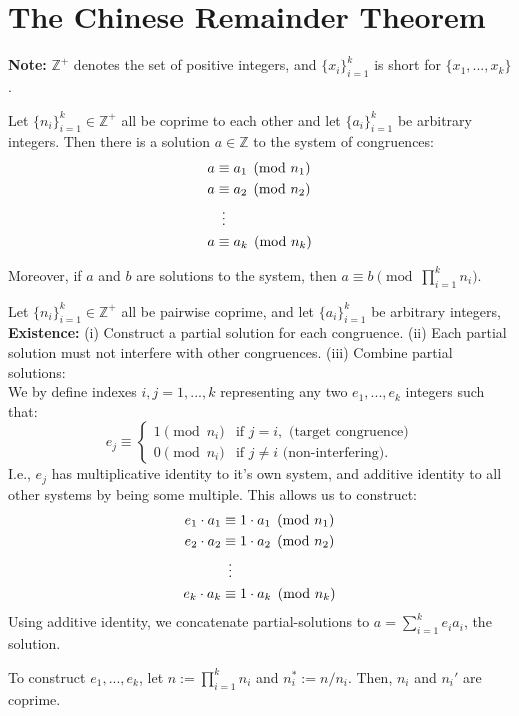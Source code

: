\section{The Chinese Remainder Theorem}

\begin{Note}
    \textbf{Note:} $\mathbb{Z}^+$ denotes the set of positive integers, and $\{x_i\}_{i=1}^k$ is short for $\{x_1,...,x_k\}$.
\end{Note}
\begin{theo}

    Let $\{n_i\}_{i=1}^k\in\mathbb{Z}^+$ all be coprime to each other and let $\{a_i\}_{i=1}^k$ be arbitrary integers. Then there is a solution $a\in\mathbb{Z}$ to the system of congruences:
    \begin{align*}
        a &\equiv a_1 \pmod{n_1} \\
        a &\equiv a_2 \pmod{n_2} \\
        &\hspace*{.5em}\vdots \\
        a &\equiv a_k \pmod{n_k}
    \end{align*}
    
    
    \noindent
    Moreover, if $a$ and $b$ are solutions to the system, then $a\equiv b\pmod{\prod_{i=1}^k n_i}$.
\end{theo}
\begin{Proof}
Let $\{n_i\}_{i=1}^k\in\mathbb{Z}^+$ all be pairwise coprime, and let $\{a_i\}_{i=1}^k$ be arbitrary integers,\\

\noindent
\textbf{Existence:} (i) Construct a partial solution for each congruence. (ii) Each
partial solution must not interfere with other congruences. (iii) Combine partial solutions:\\

\noindent
We by define indexes $i,j=1,...,k$ representing any two $e_1,...,e_k$ integers such that:
 \[e_j \equiv
 \begin{cases} 
 1 \pmod{n_i} & \text{if } j = i, \text{ (target congruence)}\\
 0 \pmod{n_i} & \text{if } j \neq i \text{ (non-interfering)}.
 \end{cases}
 \]
 I.e., $e_j$ has multiplicative identity to it's own system, and additive identity to all other systems
 by being some multiple. This allows us to construct:
 \begin{align*}
    e_1\cdot a_1 &\equiv 1\cdot a_1 \pmod{n_1} \\
    e_2\cdot a_2 &\equiv 1\cdot a_2 \pmod{n_2} \\
    &\hspace*{.5em}\vdots \\
    e_k\cdot a_k &\equiv 1\cdot a_k \pmod{n_k}
\end{align*}
Using additive identity, we concatenate partial-solutions to $a = \sum_{i=1}^k e_ia_i$, the solution.
\end{Proof}

\newpage

\begin{Proof}

\noindent
To construct $e_1,...,e_k$, let $n := \prod_{i=1}^k n_i$ and $n_i^* := n/n_i$. Then, $n_i$ and $n_i'$ are coprime.\\
\end{Proof}
